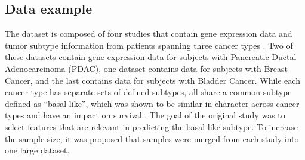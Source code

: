 


\subsection{Data example}
\label{sec:examples}

The  dataset is composed of four studies that contain gene expression data and tumor subtype information from patients spanning three cancer types \citep{moffitt2015,weinstein2013}. Two of these datasets contain
gene expression data for subjects with Pancreatic Ductal Adenocarcinoma
(PDAC), one dataset contains data for subjects with Breast Cancer, and
the last contains data for subjects with Bladder Cancer. While each cancer type has separate sets of defined subtypes, all share a common subtype defined as ``basal-like'', which was shown to be similar in character across cancer types and have an impact on survival \citep{moffitt2015}.  The goal of the original study was to select features that are relevant in predicting the basal-like subtype.  To increase the sample size, it was proposed that samples were merged from each study into one large dataset. 

